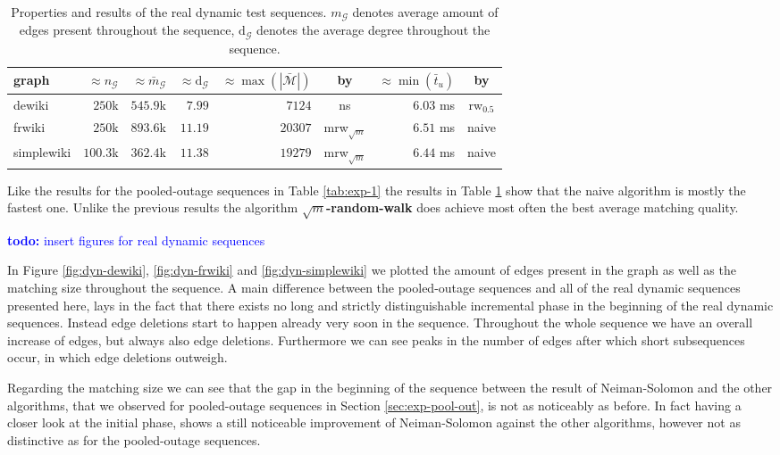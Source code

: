 \documentclass{article}      %
\newcommand\todo[1]{\textcolor{blue}{\textbf{todo: }#1}}
\begin{document}
\begin{table}
	\centering
	\tiny
	\begin{tabular}{| l || r | r | r || r | c || r | c |}
		\hline
		graph & $\approx n_\mathcal{G}$ & 
			$\approx \bar{m}_\mathcal{G}$ & 
			$\approx \mathrm{d}_\mathcal{G}$ & 
			$\approx \max(|\bar{\mathcal{M}}|)$ & by & 
			$\approx \min(\bar{t}_u)$ & by \\
		\hline
		\hline
		dewiki & $250$k & $545.9$k & $7.99$ & $7124$ & ns & $6.03$ ms & rw$_{0.5}$\\
		frwiki & $250$k & $893.6$k & $11.19$ & $20307$ & mrw$_{\sqrt{m}}$ & $ 6.51$ ms & naive \\
		simplewiki & $100.3$k & $362.4$k & $11.38$ & $19279$ & mrw$_{\sqrt{m}}$ & $6.44$ ms & naive \\
		\hline
	\end{tabular}
	\caption{Properties and results of the real dynamic test sequences. $m_\mathcal{G}$ denotes average amount of edges present throughout the sequence, $\mathrm{d}_\mathcal{G}$ denotes the average degree throughout the sequence.}
    \label{tab:exp-real-dyn}
\end{table}

Like the results for the pooled-outage sequences in Table \ref{tab:exp-1} the results in Table \ref{tab:exp-real-dyn} show that the naive algorithm is mostly the fastest one. Unlike the previous results the algorithm \textbf{$\sqrt{m}$-random-walk} does achieve most often the best average matching quality.

\todo{insert figures for real dynamic sequences}

In Figure \ref{fig:dyn-dewiki}, \ref{fig:dyn-frwiki} and \ref{fig:dyn-simplewiki} we plotted the amount of edges present in the graph as well as the matching size throughout the sequence. A main difference between the pooled-outage sequences and all of the real dynamic sequences presented here, lays in the fact that there exists no long and strictly distinguishable incremental phase in the beginning of the real dynamic sequences. Instead edge deletions start to happen already very soon in the sequence. Throughout the whole sequence we have an overall increase of edges, but always also edge deletions. Furthermore we can see peaks in the number of edges after which short subsequences occur, in which edge deletions outweigh.

Regarding the matching size we can see that the gap in the beginning of the sequence between the result of Neiman-Solomon and the other algorithms, that we observed for pooled-outage sequences in Section \ref{sec:exp-pool-out}, is not as noticeably as before. In fact having a closer look at the initial phase, shows a still noticeable improvement of Neiman-Solomon against the other algorithms, however not as distinctive as for the pooled-outage sequences.
\end{document}
